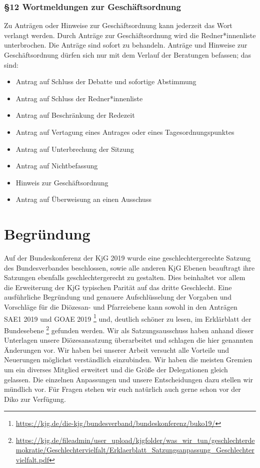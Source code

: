 \documentclass[12pt]{report}
\begin{document}
\begin{flushleft}
\subsection*{§12 Wortmeldungen zur Geschäftsordnung}
Zu Anträgen oder Hinweise zur Geschäftsordnung kann jederzeit das Wort verlangt werden. Durch Anträge
zur Geschäftsordnung wird die {\color{red}Redner*innenliste} unterbrochen. Die Anträge sind sofort zu behandeln. Anträge und
Hinweise zur Geschäftsordnung dürfen sich nur mit dem Verlauf der Beratungen befassen; das sind:

\begin{itemize}
  \item Antrag auf Schluss der Debatte und sofortige Abstimmung
  \item Antrag auf Schluss der {\color{red}Redner*innenliste}
  \item Antrag auf Beschränkung der Redezeit
  \item Antrag auf Vertagung eines Antrages oder eines Tagesordnungspunktes
  \item Antrag auf Unterbrechung der Sitzung
  \item Antrag auf Nichtbefassung
  \item Hinweis zur Geschäftsordnung
  \item Antrag auf Überweisung an einen Ausschuss
\end{itemize}

\chapter*{Begründung}
Auf der Bundeskonferenz der KjG 2019 wurde eine geschlechtergerechte Satzung des Bundesverbandes beschlossen, sowie alle anderen KjG Ebenen beauftragt ihre Satzungen ebenfalls geschlechtergerecht zu gestalten. Dies beinhaltet vor allem die Erweiterung der KjG typischen Parität auf das dritte Geschlecht.
Eine ausführliche Begründung und genauere Aufschlüsselung der Vorgaben und Vorschläge für die Diözesan- und Pfarreiebene kann sowohl in den Anträgen SAE1 2019 und GOAE 2019
\footnote{\url{https://kjg.de/die-kjg/bundesverband/bundeskonferenz/buko19/}} und, deutlich schöner zu lesen, im Erklärblatt der Bundesebene \footnote{\url{https://kjg.de/fileadmin/user_upload/kjgfolder/was_wir_tun/geschlechterdemokratie/Geschlechtervielfalt/Erklaerblatt_Satzungsanpassung_Geschlechtervielfalt.pdf}} gefunden werden. Wir als Satzungsausschuss haben anhand dieser Unterlagen unsere Diözesansatzung überarbeitet und schlagen die hier genannten Änderungen vor. Wir haben bei unserer Arbeit versucht alle Vorteile und Neuerungen möglichst verständlich einzubinden. Wir haben die meisten Gremien um ein diverses Mitglied erweitert und die Größe der Delegationen gleich gelassen. Die einzelnen Anpassungen und unsere Entscheidungen dazu stellen wir mündlich vor. Für Fragen stehen wir euch natürlich auch gerne schon vor der Diko zur Verfügung.


\end{flushleft}
\end{document}
